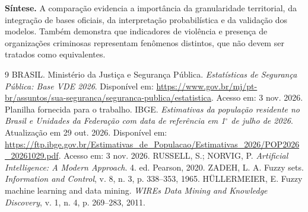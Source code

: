 \documentclass[12pt,a4paper]{article}
\begin{document}
\textbf{Síntese.} A comparação evidencia a importância da granularidade territorial, da integração de bases oficiais, da interpretação probabilística e da validação dos modelos. Também demonstra que indicadores de violência e presença de organizações criminosas representam fenômenos distintos, que não devem ser tratados como equivalentes.

\begin{thebibliography}{9}\small
{} BRASIL. Ministério da Justiça e Segurança Pública. \textit{Estatísticas de Segurança Pública: Base VDE 2026}. Disponível em: \url{https://www.gov.br/mj/pt-br/assuntos/sua-seguranca/seguranca-publica/estatistica}. Acesso em: 3 nov. 2026. Planilha fornecida para o trabalho.
 IBGE. \textit{Estimativas da população residente no Brasil e Unidades da Federação com data de referência em 1$^{\circ}$ de julho de 2026}. Atualização em 29 out. 2026. Disponível em: \url{https://ftp.ibge.gov.br/Estimativas_de_Populacao/Estimativas_2026/POP2026_20261029.pdf}. Acesso em: 3 nov. 2026.
 RUSSELL, S.; NORVIG, P. \textit{Artificial Intelligence: A Modern Approach}. 4. ed. Pearson, 2020.
 ZADEH, L. A. Fuzzy sets. \textit{Information and Control}, v. 8, n. 3, p. 338--353, 1965.
 HÜLLERMEIER, E. Fuzzy machine learning and data mining. \textit{WIREs Data Mining and Knowledge Discovery}, v. 1, n. 4, p. 269--283, 2011.
\end{thebibliography}
\appendix
\end{document}
